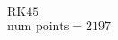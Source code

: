 \documentclass[preview]{standalone}
\begin{document}
\begin{align*}
\text{RK45} \\ \text{num points} = 2197
\end{align*}
\end{document}
